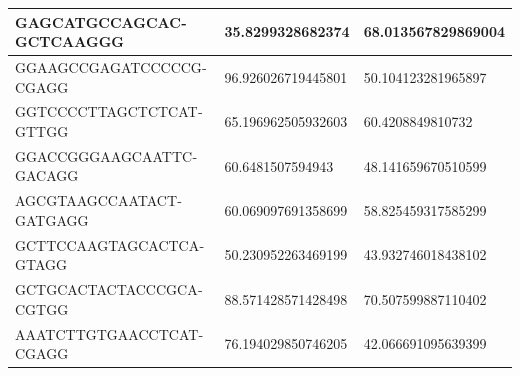 \documentclass[12pt,a4paper,BCOR=.7cm,headsepline,bibliography=totoc]{report}
\begin{document}
\begin{table}[!ht]
\begin{latin}
\begin{tabularx}{\textwidth}{|l|Y|Y|}
	GAGCATGCCAGCACGCTCAAGGG & 35.8299328682374 & 68.013567829869004 \\ \hline
	GGAAGCCGAGATCCCCCGCGAGG & 96.926026719445801 & 50.104123281965897 \\ \hline
	GGTCCCCTTAGCTCTCATGTTGG & 65.196962505932603 & 60.4208849810732 \\ \hline
	GGACCGGGAAGCAATTCGACAGG & 60.6481507594943 & 48.141659670510599 \\ \hline
	AGCGTAAGCCAATACTGATGAGG & 60.069097691358699 & 58.825459317585299 \\ \hline
	GCTTCCAAGTAGCACTCAGTAGG & 50.230952263469199 & 43.932746018438102 \\ \hline
	GCTGCACTACTACCCGCACGTGG & 88.571428571428498 & 70.507599887110402 \\ \hline
	AAATCTTGTGAACCTCATCGAGG & 76.194029850746205 & 42.066691095639399 \\ \hline
\end{tabularx}
\end{latin}
\end{table}
\end{document}
